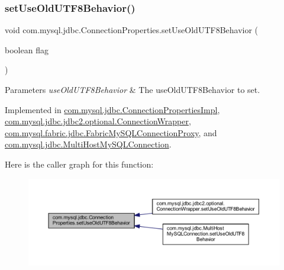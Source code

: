 \subsubsection{\texorpdfstring{set\+Use\+Old\+U\+T\+F8\+Behavior()}{setUseOldUTF8Behavior()}}
{\footnotesize\ttfamily void com.\+mysql.\+jdbc.\+Connection\+Properties.\+set\+Use\+Old\+U\+T\+F8\+Behavior (\begin{DoxyParamCaption}\item[{boolean}]{flag }\end{DoxyParamCaption})}


\begin{DoxyParams}{Parameters}
{\em use\+Old\+U\+T\+F8\+Behavior} & The use\+Old\+U\+T\+F8\+Behavior to set. \\
\hline
\end{DoxyParams}


Implemented in \mbox{\hyperlink{classcom_1_1mysql_1_1jdbc_1_1_connection_properties_impl_a107bd1adbf3a000c1814ae66a5193025}{com.\+mysql.\+jdbc.\+Connection\+Properties\+Impl}}, \mbox{\hyperlink{classcom_1_1mysql_1_1jdbc_1_1jdbc2_1_1optional_1_1_connection_wrapper_aa0de2a1679fb6e3d601d2bd55607d60a}{com.\+mysql.\+jdbc.\+jdbc2.\+optional.\+Connection\+Wrapper}}, \mbox{\hyperlink{classcom_1_1mysql_1_1fabric_1_1jdbc_1_1_fabric_my_s_q_l_connection_proxy_a4e9eecea6c90fba5acc7d7a4cdbd36fe}{com.\+mysql.\+fabric.\+jdbc.\+Fabric\+My\+S\+Q\+L\+Connection\+Proxy}}, and \mbox{\hyperlink{classcom_1_1mysql_1_1jdbc_1_1_multi_host_my_s_q_l_connection_abafab2c58d9f694f0b8d332f19d012f3}{com.\+mysql.\+jdbc.\+Multi\+Host\+My\+S\+Q\+L\+Connection}}.

Here is the caller graph for this function\+:\nopagebreak
\begin{figure}[H]
\begin{center}
\leavevmode
\includegraphics[width=350pt]{interfacecom_1_1mysql_1_1jdbc_1_1_connection_properties_a0ae502be4bb0e0dca960587d7883a663_icgraph}
\end{center}
\end{figure}
\mbox{\label{interfacecom_1_1mysql_1_1jdbc_1_1_connection_properties_a4d6983e3fcbf208b481c59edb1aa793b}} 
